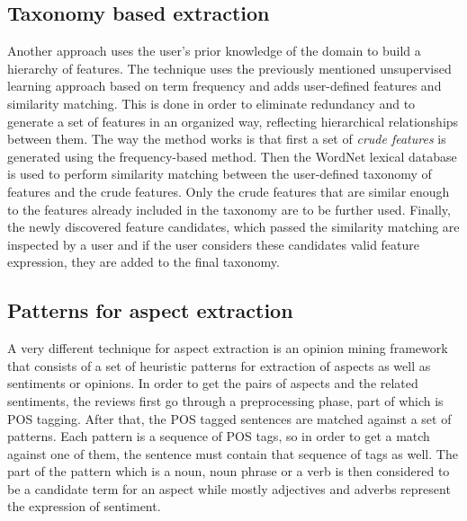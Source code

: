 \subsection{Taxonomy based extraction}
\label{sec:taxonomy}
 Another approach uses the user's prior knowledge of the domain to build a hierarchy of features. The technique uses the previously mentioned unsupervised learning approach based on term frequency and adds user-defined features and similarity matching. This is done in order to eliminate redundancy  and to generate a set of features in an organized way, reflecting hierarchical relationships between them.
The way the method works is that first a set of \textit{crude features} is generated using the frequency-based method.
Then  the WordNet lexical database is used to perform similarity matching between the user-defined taxonomy of features and the crude features. Only the crude features that are similar enough to the features already included in the taxonomy are to be further used. 
Finally, the newly discovered feature candidates, which passed the similarity matching are inspected by a user and if the user considers these candidates valid feature expression, they are added to the final taxonomy. \cite{carenini_2005}
\subsection{Patterns for aspect extraction}
A very different technique for aspect extraction is an opinion mining framework that consists of a set of heuristic patterns for extraction of aspects as well as sentiments or opinions. 
In order to get the pairs of aspects and the related sentiments, the reviews first go through a preprocessing phase, part of which is POS tagging. After that, the POS tagged sentences are matched against a set of patterns. Each pattern is a sequence of POS tags, so in order to get a match against one of them, the sentence must contain that sequence of tags as well. 
The part of the pattern which is a noun, noun phrase or a verb is then considered to be a candidate term for an aspect while mostly adjectives and adverbs represent the expression of sentiment. \cite{asghar_2019}

